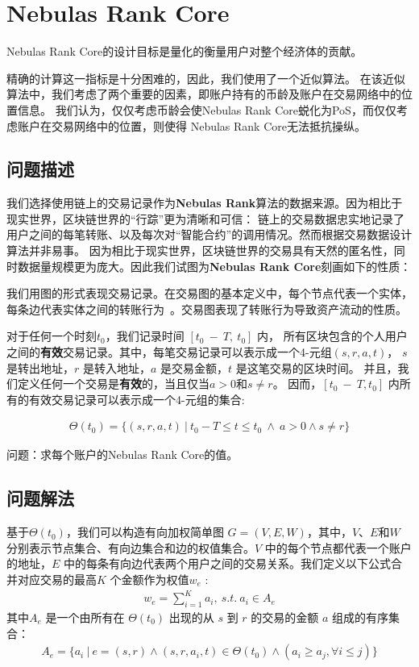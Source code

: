 \section{Nebulas Rank Core}

Nebulas Rank Core的设计目标是量化的衡量用户对整个经济体的贡献。

精确的计算这一指标是十分困难的，因此，我们使用了一个近似算法。
在该近似算法中，我们考虑了两个重要的因素，即账户持有的币龄及账户在交易网络中的位置信息。
我们认为，仅仅考虑币龄会使Nebulas Rank Core蜕化为PoS，而仅仅考虑账户在交易网络中的位置，则使得
Nebulas Rank Core无法抵抗操纵。


\subsection{问题描述} \label{subsec:txg}
我们选择使用链上的交易记录作为\textbf{Nebulas Rank}算法的数据来源。因为相比于现实世界，区块链世界的“行踪”更为清晰和可信：
链上的交易数据忠实地记录了用户之间的每笔转账、以及每次对“智能合约”的调用情况。然而根据交易数据设计算法并非易事。
因为相比于现实世界，区块链世界的交易具有天然的匿名性，同时数据量规模更为庞大。因此我们试图为\textbf{Nebulas Rank Core}刻画如下的性质：

我们用图的形式表现交易记录。在交易图的基本定义中，每个节点代表一个实体，
每条边代表实体之间的转账行为~\cite{Tschorsch2015}。交易图表现了转账行为导致资产流动的性质。

对于任何一个时刻$t_0$，我们记录时间 $[t_0\ −\ T,\ t_0]$ 内，
所有区块包含的个人用户之间的\textbf{有效}交易记录。其中，每笔交易记录可以表示成一个4-元组$(s,r,a,t)$，
$s$ 是转出地址，$r$ 是转入地址，$a$ 是交易金额，$t$ 是这笔交易的区块时间。
并且，我们定义任何一个交易是\textbf{有效}的，当且仅当$a > 0$和$s \neq r$。
因而，$[t_0\ −\ T, t_0]$ 内所有的有效交易记录可以表示成一个4-元组的集合:

\begin{align}
\Theta(t_0) = \{(s, r, a, t)\ |\ t_0 - T \le t \le t_0\ \land \ a > 0 \land s \neq r \}
\end{align}

问题：求每个账户的Nebulas Rank Core的值。

\subsection{问题解法}


基于$\Theta(t_0)$，我们可以构造有向加权简单图 $G = (V, E, W)$，其中，$V$、$E$和$W$ 分别表示节点集合、有向边集合和边的权值集合。$V$ 中的每个节点都代表一个账户的地址，$E$ 中的每条有向边代表两个用户之间的交易关系。我们定义以下公式合并对应交易的最高$K$ 个金额作为权值$w_e$ :
\begin{align}\label{formula:edgeweight}
w_e = \sum_{i=1}^K a_i,\ s.t.\ a_i \in A_e
\end{align}
其中$A_e$ 是一个由所有在 $\Theta(t_0)$ 出现的从 $s$ 到 $r$ 的交易的金额 $a$ 组成的有序集合：
\begin{align}
A_e = \{a_i\ |\ e = (s,r) \land (s, r, a_i, t) \in \Theta(t_0) \land (a_i \ge a_j, \forall i \le j) \}
\end{align}

